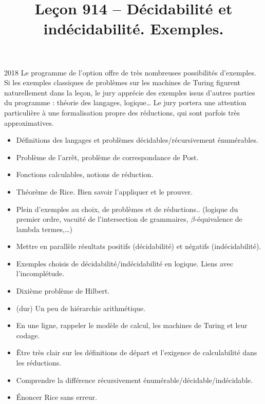 \documentclass{agregfiche}
\title{Leçon 914 -- Décidabilité et indécidabilité. Exemples.}
\begin{document}
\maketitle

\secrapports

\begin{rapport}{2018}
Le programme de l'option offre de très nombreuses possibilités d'exemples. Si les exemples classiques de problèmes sur les machines de Turing figurent naturellement dans la leçon, le jury apprécie des exemples issus d'autres parties du programme : théorie des langages, logique\dots
Le jury portera une attention particulière à une formalisation propre des réductions, qui sont parfois très approximatives.
\end{rapport}

\secindispensables

\begin{itemize}
\item Définitions des langages et problèmes décidables/récursivement énumérables.
\item Problème de l'arrêt, problème de correspondance de Post.
\item Fonctions calculables, notions de réduction.
\end{itemize}

\secasavoir

\begin{itemize}
    \item Théorème de Rice. Bien savoir l'appliquer et le prouver.
	\item Plein d'exemples au choix, de problèmes et de réductions.. (logique du premier ordre, vacuité de l'intersection de grammaires, $\beta$-équivalence de lambda termes,\dots)
\end{itemize}


\secidees
\begin{itemize}
\item Mettre en parallèle résultats positifs (décidabilité) et négatifs (indécidabilité).
\item Exemples choisis de décidabilité/indécidabilité en logique. Liens avec l'incomplétude.
\item Dixième problème de Hilbert.
\item (dur) Un peu de hiérarchie arithmétique.
\end{itemize}

\secpieges

\begin{itemize}
\item En une ligne, rappeler le modèle de calcul, les machines de Turing et leur codage.
\item Être très clair sur les définitions de départ et l'exigence de calculabilité dans les réductions.
\item Comprendre la différence récursivement énumérable/décidable/indécidable.
\item Énoncer Rice sans erreur.
\end{itemize}
\end{document}
